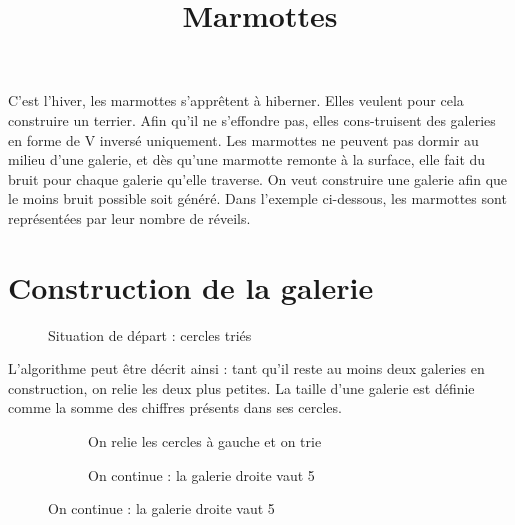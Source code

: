 \documentclass[11pt,a5paper]{article}
\date{\vspace{-12ex}}
\title{\vspace{-5ex}Marmottes}
\begin{document}
\maketitle
\thispagestyle{fancy}
\justifying

C’est l’hiver, les marmottes s’apprêtent à hiberner. Elles veulent pour cela construire un terrier. Afin qu'il ne s’effondre pas, elles cons-truisent des galeries en forme de V inversé uniquement. Les marmottes ne peuvent pas dormir au
milieu d'une galerie, et dès qu'une marmotte remonte à la surface, elle fait du bruit pour chaque galerie qu'elle traverse. On veut construire une galerie afin que le moins bruit possible soit généré.
Dans l'exemple ci-dessous, les marmottes sont représentées par leur nombre de réveils. 
\section*{Construction de la galerie}

\begin{figure}
\caption{Situation de départ : cercles triés}
\end{figure}

L'algorithme peut être décrit ainsi : tant qu'il reste au moins deux galeries en construction, on relie les deux plus petites.
La taille d'une galerie est définie comme la somme des chiffres présents dans ses cercles.

\begin{figure}[h!]
\begin{subfigure}{0.5\textwidth}
  \centering
{}
  \caption{On relie les cercles à gauche et on trie}
\end{subfigure}%
\hfill
\begin{subfigure}{0.5\textwidth}
  \centering
{}
  \caption{\hspace{3mm}On continue : la galerie droite vaut 5}
\end{subfigure}
\end{figure}
\end{document}
